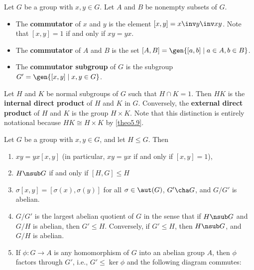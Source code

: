 \begin{defn}
    \item Let $G$ be a group with $x, y \in G$. Let $A$ and $B$ be nonempty subsets of $G$.
    \begin{itemize}
        \item The \textbf{commutator} of $x$ and $y$ is the element $[x, y] = x\inv y\inv xy$. Note that $[x, y] = 1$ if and only if $xy = yx$.
        \item The \textbf{commutator} of $A$ and $B$ is the set $[A, B] = \gen{[a, b] \mid a \in A, b \in B}$.
        \item The \textbf{commutator subgroup} of $G$ is the subgroup $G' = \gen{[x, y] \mid x, y \in G}$.
    \end{itemize}
    \item Let $H$ and $K$ be normal subgroups of $G$ such that $H \cap K = 1$. Then $HK$ is the \textbf{internal direct product} of $H$ and $K$ in $G$. Conversely, the \textbf{external direct product} of $H$ and $K$ is the group $H \times K$. Note that this distinction is entirely notational because $HK \cong H \times K$ by \autoref{theo5.9}.
\end{defn}

\begin{prop}
    \label{prop5.7}
    Let $G$ be a group with $x, y \in G$, and let $H \leq G$. Then
    \begin{enumerate}
        \item $xy = yx[x, y]$ (in particular, $xy = yx$ if and only if $[x, y] = 1$),
        \item $H \nsub G$ if and only if $[H, G] \leq H$
        \item $\sigma[x, y] = [\sigma(x), \sigma(y)]$ for all $\sigma \in \aut(G)$, $G' \cha G$, and $G/G'$ is abelian.
        \item $G/G'$ is the largest abelian quotient of $G$ in the sense that if $H \nsub G$ and $G/H$ is abelian, then $G' \leq H$. Conversely, if $G' \leq H$, then $H \nsub G$, and $G/H$ is abelian.
        \item If $\phi : G \to A$ is any homomorphism of $G$ into an abelian group $A$, then $\phi$ factors through $G'$, i.e., $G' \leq \ker\phi$ and the following diagram commutes:
        \begin{center}
        \end{center}
    \end{enumerate}
\end{prop}

